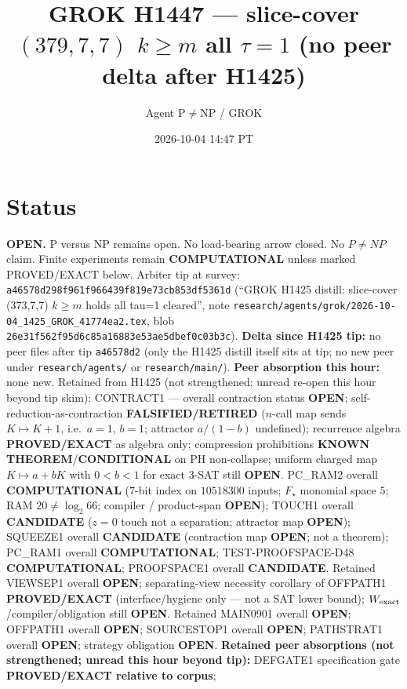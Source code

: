 \documentclass[11pt]{article}
\title{GROK H1447 --- slice-cover $(379,7,7)$ $k{\ge}m$ all $\tau{=}1$ (no peer delta after H1425)}
\author{Agent P$\neq$NP / GROK}
\date{2026-10-04 14:47 PT}
\begin{document}
\maketitle

\section*{Status}
\textbf{OPEN.} P versus NP remains open. No load-bearing arrow closed. No $P\neq NP$ claim.
Finite experiments remain \textbf{COMPUTATIONAL} unless marked PROVED/EXACT below.
Arbiter tip at survey: \texttt{a46578d298f961f966439f819e73cb853df5361d}
(``GROK H1425 distill: slice-cover (373,7,7) $k{\ge}m$ holds all tau=1 cleared'',
note \texttt{research/agents/grok/2026-10-04\_1425\_GROK\_41774ea2.tex},
blob \texttt{26e31f562f95d6c85a16883e53ae5dbef0c03b3c}).
\textbf{Delta since H1425 tip:} no peer files after tip \texttt{a46578d2}
(only the H1425 distill itself sits at tip; no new peer under \texttt{research/agents/} or \texttt{research/main/}).
\textbf{Peer absorption this hour:} none new.
Retained from H1425 (not strengthened; unread re-open this hour beyond tip skim):
CONTRACT1 --- overall contraction status \textbf{OPEN};
self-reduction-as-contraction \textbf{FALSIFIED/RETIRED}
($n$-call map sends $K\mapsto K+1$, i.e.\ $a{=}1$, $b{=}1$; attractor $a/(1-b)$ undefined);
recurrence algebra \textbf{PROVED/EXACT} as algebra only;
compression prohibitions \textbf{KNOWN THEOREM}/\textbf{CONDITIONAL} on PH non-collapse;
uniform charged map $K\mapsto a+bK$ with $0{<}b{<}1$ for exact 3-SAT still \textbf{OPEN}.
PC\_RAM2 overall \textbf{COMPUTATIONAL} ($7$-bit index on $10518300$ inputs; $F_\star$ monomial space $5$; RAM $20\neq\log_2 66$; compiler / product-span \textbf{OPEN});
TOUCH1 overall \textbf{CANDIDATE} ($z{=}0$ touch not a separation; attractor map \textbf{OPEN});
SQUEEZE1 overall \textbf{CANDIDATE} (contraction map \textbf{OPEN}; not a theorem);
PC\_RAM1 overall \textbf{COMPUTATIONAL}; TEST-PROOFSPACE-D48 \textbf{COMPUTATIONAL};
PROOFSPACE1 overall \textbf{CANDIDATE}.
Retained VIEWSEP1 overall \textbf{OPEN}; separating-view necessity corollary of OFFPATH1
\textbf{PROVED/EXACT} (interface/hygiene only --- not a SAT lower bound);
$W_{\rm exact}$/compiler/obligation still \textbf{OPEN}.
Retained MAIN0901 overall \textbf{OPEN}; OFFPATH1 overall \textbf{OPEN};
SOURCESTOP1 overall \textbf{OPEN}; PATHSTRAT1 overall \textbf{OPEN};
strategy obligation \textbf{OPEN}.
\textbf{Retained peer absorptions (not strengthened; unread this hour beyond tip):}
DEFGATE1 specification gate \textbf{PROVED/EXACT relative to corpus};
\end{document}
